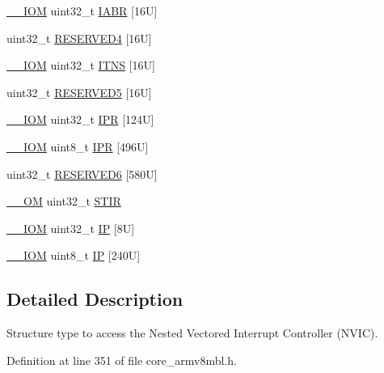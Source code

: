 \begin{DoxyCompactItemize}
\hyperlink{core__sc300_8h_ab6caba5853a60a17e8e04499b52bf691}{\+\_\+\+\_\+\+I\+OM} uint32\+\_\+t \hyperlink{struct_n_v_i_c___type_a6e42ca3d9a1e12e75463cef68785d533}{I\+A\+BR} \mbox{[}16\+U\mbox{]}
\item 
uint32\+\_\+t \hyperlink{struct_n_v_i_c___type_ab7e7cff95dfc1edc0c0dcce4e8345a6a}{R\+E\+S\+E\+R\+V\+E\+D4} \mbox{[}16\+U\mbox{]}
\item 
\hyperlink{core__sc300_8h_ab6caba5853a60a17e8e04499b52bf691}{\+\_\+\+\_\+\+I\+OM} uint32\+\_\+t \hyperlink{struct_n_v_i_c___type_a4940c96f11d1c95d95a28e388f04d6d6}{I\+T\+NS} \mbox{[}16\+U\mbox{]}
\item 
uint32\+\_\+t \hyperlink{struct_n_v_i_c___type_ae71fe7b11f01c3702aa6253b5309bbf9}{R\+E\+S\+E\+R\+V\+E\+D5} \mbox{[}16\+U\mbox{]}
\item 
\hyperlink{core__sc300_8h_ab6caba5853a60a17e8e04499b52bf691}{\+\_\+\+\_\+\+I\+OM} uint32\+\_\+t \hyperlink{struct_n_v_i_c___type_a71598b2d46c2fa6708a7908a1c63c43c}{I\+PR} \mbox{[}124\+U\mbox{]}
\item 
\hyperlink{core__sc300_8h_ab6caba5853a60a17e8e04499b52bf691}{\+\_\+\+\_\+\+I\+OM} uint8\+\_\+t \hyperlink{struct_n_v_i_c___type_adfd45d2d45654c4e775017800f33e9a3}{I\+PR} \mbox{[}496\+U\mbox{]}
\item 
uint32\+\_\+t \hyperlink{struct_n_v_i_c___type_ad91f19091b4eecbe7322cdb36fad41c8}{R\+E\+S\+E\+R\+V\+E\+D6} \mbox{[}580\+U\mbox{]}
\item 
\hyperlink{core__sc300_8h_a0ea2009ed8fd9ef35b48708280fdb758}{\+\_\+\+\_\+\+OM} uint32\+\_\+t \hyperlink{struct_n_v_i_c___type_a37de89637466e007171c6b135299bc75}{S\+T\+IR}
\item 
\hyperlink{core__sc300_8h_ab6caba5853a60a17e8e04499b52bf691}{\+\_\+\+\_\+\+I\+OM} uint32\+\_\+t \hyperlink{struct_n_v_i_c___type_a4eef47929a0d1317a107f1ac62e28464}{IP} \mbox{[}8\+U\mbox{]}
\item 
\hyperlink{core__sc300_8h_ab6caba5853a60a17e8e04499b52bf691}{\+\_\+\+\_\+\+I\+OM} uint8\+\_\+t \hyperlink{struct_n_v_i_c___type_a9a4341692e45d089a113986a3d344e98}{IP} \mbox{[}240\+U\mbox{]}
\end{DoxyCompactItemize}


\subsection{Detailed Description}
Structure type to access the Nested Vectored Interrupt Controller (N\+V\+IC). 

Definition at line 351 of file core\+\_\+armv8mbl.\+h.



